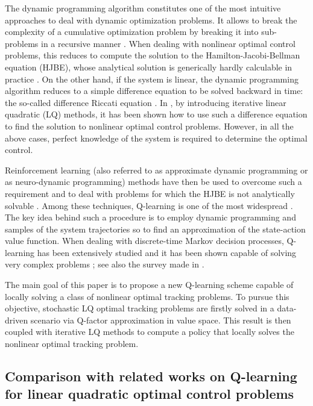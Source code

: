 \documentclass[10pt]{IEEEtran}      %
\theoremstyle{theorem}
\theoremstyle{remark}
\begin{document}
The dynamic programming algorithm \cite{bertsekas2005dynamic} constitutes one of the most intuitive approaches to deal
with dynamic optimization problems. It allows to break the complexity of a cumulative optimization problem by breaking it
into sub-problems in a recursive manner \cite{kirk2004optimal}. When dealing with nonlinear optimal control problems,
this reduces to compute the solution to the Hamilton-Jacobi-Bellman equation (HJBE), whose analytical
solution is generically hardly calculable in practice \cite{werbos1992approximate}. On the other hand, if the system is linear,
the dynamic programming algorithm reduces to a simple difference equation to be solved backward in time: the so-called difference Riccati equation
\cite{dorato1985optimal,ferrante2013generalised,ntogramatzidis2019geometry}.
In \cite{li2004iterative,1469949,li2007iterative,kumar2016optimal}, by introducing iterative linear quadratic (LQ) methods,
it has been shown how to use such 
a difference equation to find the solution to nonlinear optimal control problems.
However, in all the above cases, perfect knowledge of the system is required to determine the optimal control.

Reinforcement learning (also referred to as approximate dynamic programming or as
neuro-dynamic programming) methods have then be used to overcome such a requirement and 
to deal with problems for which the HJBE is not analytically solvable \cite{bertsekas1995neuro,bersekas2018reinf}.
Among these techniques, Q-learning is one of the most widespread \cite{watkins1992q}. The key idea
behind such a procedure is to employ dynamic programming and samples of the system trajectories so to
find an approximation of the state-action value function. When dealing with discrete-time
Markov decision processes, Q-learning has been extensively studied and it has been shown capable of
solving very complex problems \cite{mnih2017methods}; see also the survey made in \cite{lewis2012reinforcement}.

The main goal of this paper is to propose a new Q-learning scheme capable of locally solving a class of nonlinear optimal tracking problems.
To pursue this objective, stochastic LQ optimal tracking problems are firstly solved in a data-driven scenario via Q-factor approximation
in value space. This result is then coupled with iterative LQ methods to compute a policy that  locally solves the nonlinear optimal tracking problem.


\subsection{Comparison with related works on Q-learning for linear quadratic optimal control problems}
\end{document}
